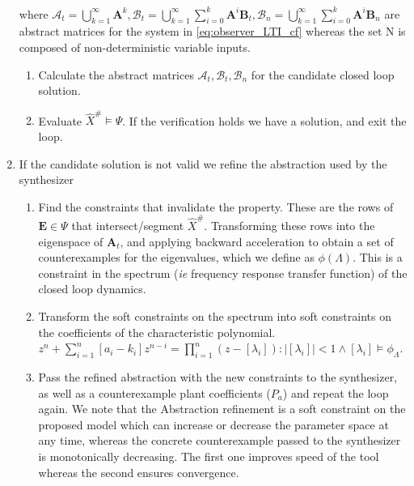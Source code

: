 \documentclass[runningheads,a4paper]{llncs}
\newcommand{\mat}[1]{\boldsymbol{#1}}
\begin{document}
\begin{enumerate}
\begin{align}
\end{align}
%
where $\mathcal{A}_t=\bigcup_{k=1}^\infty \mat{A}^k, \mathcal{B}_{t}=\bigcup_{k=1}^\infty \sum_{i=0}^k\mat{A}^i\mat{B}_{t}, \mathcal{B}_{n}=\bigcup_{k=1}^\infty \sum_{i=0}^k\mat{A}^i\mat{B}_{n}$ are abstract matrices for the system in \eqref{eq:observer_LTI_cf} 
whereas the set N is composed of non-deterministic variable inputs.


\begin{enumerate}
\item Calculate the abstract matrices $\mathcal{A}_t, \mathcal{B}_{t},\mathcal{B}_{n}$ for the candidate closed loop solution.
\item Evaluate $\hat{X}^\# \models \Psi$. If the verification holds we have a solution, and exit the loop.
\end{enumerate} 
\item If the candidate solution is not valid we refine the abstraction used by the synthesizer
\begin{enumerate}
\item Find the constraints that invalidate the property. These are the rows of $\mat{E} \in \Psi$ that intersect/segment $\hat{X}^\#$. Transforming these rows into the eigenspace of $\mat{A}_t$, and applying backward acceleration to obtain a set of counterexamples for the eigenvalues, which we define as $\phi(\Lambda)$. This is a constraint in the spectrum (\emph{ie} frequency response transfer function) of the closed loop dynamics. 
\item Transform the soft constraints on the spectrum into soft constraints on the coefficients of the characteristic polynomial. 
$z^n+\sum_{i=1}^n[a_i-k_i]z^{n-i}=\prod_{i=1}^n (z-[\lambda_i]) : |[\lambda_i]|<1 \wedge [\lambda_i] \models \phi_{\Lambda}$.
\item Pass the refined abstraction with the new constraints to the synthesizer, as well as a counterexample plant coefficients ($P_a$) and repeat the loop again. We note that the Abstraction refinement is a soft constraint on the proposed model which can increase or decrease the parameter space at any time, whereas the concrete counterexample passed to the synthesizer is monotonically decreasing. The first one improves speed of the tool whereas the second ensures convergence.

\end{enumerate} 
\end{enumerate}
\end{document}
